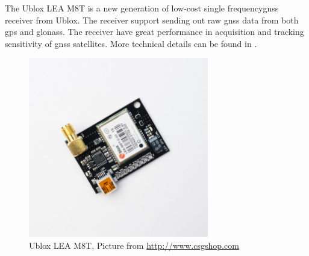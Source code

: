 The Ublox LEA M8T is a new generation of low-cost single frequency\gls{gnss} receiver from Ublox. The receiver support sending out raw \gls{gnss} data from both \gls{gps} and \gls{glonass}. The receiver have great performance in acquisition and tracking sensitivity of \gls{gnss} satellites. More technical details can be found in  \citep{UbloxDataSheet,UbloxReceiverDescription}.
\begin{figure}[H]
	\centering
		\includegraphics[width=0.7\textwidth]{figs/ubloxLeaM8T.jpg}
		\caption{Ublox LEA M8T, Picture from \url{http://www.csgshop.com}}
		\label{figure:Ublox}
\end{figure}
